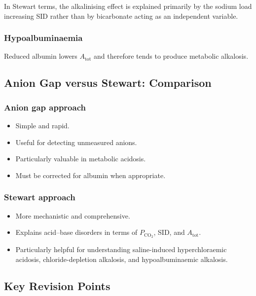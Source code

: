 \documentclass[11pt,a4paper]{article}
\begin{document}
In Stewart terms, the alkalinising effect is explained primarily by the sodium load increasing SID rather than by bicarbonate acting as an independent variable.

\subsubsection{Hypoalbuminaemia}

Reduced albumin lowers \(A_{\mathrm{tot}}\) and therefore tends to produce metabolic alkalosis.

\subsection{Anion Gap versus Stewart: Comparison}

\subsubsection{Anion gap approach}

\begin{itemize}
    \item Simple and rapid.
    \item Useful for detecting unmeasured anions.
    \item Particularly valuable in metabolic acidosis.
    \item Must be corrected for albumin when appropriate.
\end{itemize}

\subsubsection{Stewart approach}

\begin{itemize}
    \item More mechanistic and comprehensive.
    \item Explains acid--base disorders in terms of \(P_{\mathrm{CO_2}}\), SID, and \(A_{\mathrm{tot}}\).
    \item Particularly helpful for understanding saline-induced hyperchloraemic acidosis, chloride-depletion alkalosis, and hypoalbuminaemic alkalosis.
\end{itemize}

\subsection{Key Revision Points}
\end{document}
